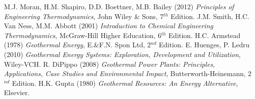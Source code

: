 \documentclass[11pt,oneside,a4paper]{article}
\begin{document}
\begin{thebibliography}{1}
%
 M.J. Moran, H.M. Shapiro, D.D. Boettner, M.B. Bailey (2012) {\it Principles of Engineering Thermodynamics}, John Wiley $\&$ Sons, 7$^{th}$ Edition.
 J.M. Smith, H.C. Van Ness, M.M. Abbott (2001) {\it Introduction to Chemical Engineering Thermodynamics}, McGraw-Hill Higher Education, 6$^{th}$ Edition.
 H.C. Armstead (1978) {\it Geothermal Energy}, E.$\&$F.N. Spon Ltd, 2$^{nd}$ Edition.
 E. Huenges, P. Ledru (2010) {\it Geothermal Energy Systems: Exploration, Development and Utilization}, Wiley-VCH.
 R. DiPippo (2008) {\it Geothermal Power Plants: Principles, Applications, Case Studies and Environmental Impact}, Butterworth-Heinemann, 2$^{nd}$ Edition.
 H.K. Gupta (1980) {\it Geothermal Resources: An Energy Alternative}, Elsevier.
%
\end{thebibliography}
\end{document}

